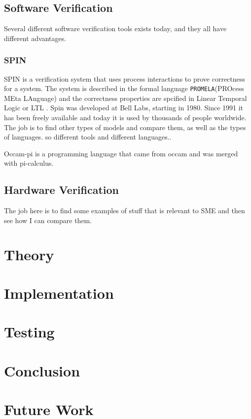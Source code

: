 \documentclass[a4paper]{article}
\begin{document}
\subsection{Software Verification}
Several different software verification tools exists today, and they all have different advantages.
\subsubsection*{SPIN}
SPIN  is a verification system that uses process interactions to prove correctness for a system. The system is described in the formal language \texttt{PROMELA}(PROcess MEta LAnguage) and the correctness properties are spcified in Linear Temporal Logic or LTL . Spin was developed at Bell Labs, starting in 1980. Since 1991 it has been freely available and today it is used by thousands of people worldwide.\\
The job is to find other types of models and compare them, as well as the types of languages. so different tools and different languages.. 

Occam-pi is a programming language that came from occam and was merged with pi-calculus. 

\subsection{Hardware Verification}
The job here is to find some examples of stuff that is relevant to SME and then see how I can compare them. 
\section{Theory}

\section{Implementation}

\section{Testing}

\section{Conclusion}

\section{Future Work}


\newpage


\end{document}
